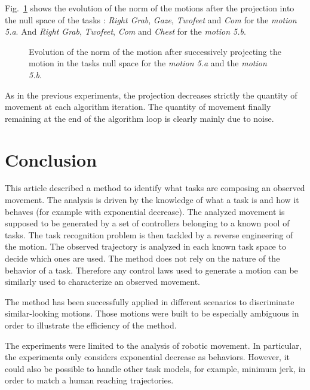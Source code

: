 \documentclass[letterpaper, 10pt, conference]{ieeeconf}      %
\begin{document}
Fig.~\ref{fig:exp6:PqdotNorms5} shows the evolution of the norm of the motions after the projection
into the null space of the tasks : \emph{Right Grab},  \emph{Gaze}, \emph{Twofeet} and \emph{Com} for
the \emph{motion 5.a}. And \emph{Right Grab}, \emph{Twofeet}, \emph{Com} and \emph{Chest} for the
\emph{motion 5.b}.
\begin{figure}[t]
  \centering
  \subfigure[Motion 5.a]{
  \resizebox{.48\textwidth}{!} {
    
  }
  }
  \subfigure[Motion 5.b]{
  \resizebox{.48\textwidth}{!} {
    
  }
}
\caption{Evolution of the norm of the motion after successively projecting the motion in the tasks null space for
the \emph{motion 5.a} and the \emph{motion 5.b}.}
\label{fig:exp6:PqdotNorms5}
\end{figure}
As in the previous experiments, the projection decreases strictly the quantity of movement
at each algorithm iteration. The quantity of movement finally remaining at the end of 
the algorithm loop is clearly mainly due to noise.

\section{Conclusion}
This article described a method to identify what tasks are composing an observed movement.
The analysis is driven by the knowledge
of what a task is and how it behaves (for example with exponential decrease). 
The analyzed movement is supposed to be generated by a set of 
controllers belonging to a known pool of tasks. 
The task recognition problem is then tackled by a reverse engineering of the motion.
The observed trajectory is analyzed
in each known task space to decide which ones are used.
The method does not rely on the nature of the behavior of a task. Therefore
any control laws used to generate a motion can be similarly
used to characterize an observed movement.

The method has been successfully applied in different
scenarios to discriminate similar-looking motions. Those motions were built to be especially
ambiguous in order to illustrate the efficiency of the method.

The experiments were limited to the analysis of robotic movement. In particular,
the experiments only considers exponential decrease as behaviors.
However, it could also be possible to handle other task models, for example, minimum jerk,
in order to match a human reaching trajectories.



\end{document}
